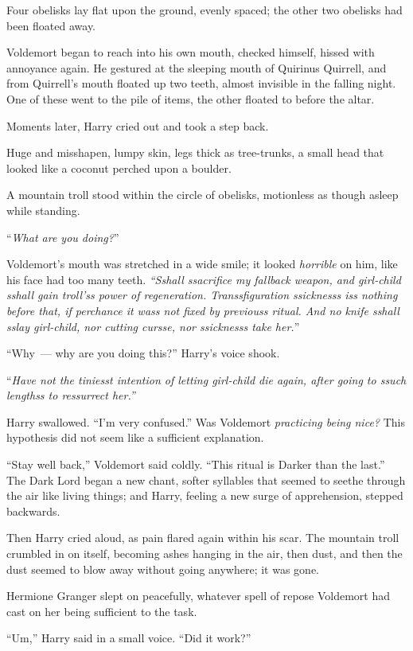 Four obelisks lay flat upon the ground, evenly spaced; the other two obelisks had been floated away.

Voldemort began to reach into his own mouth, checked himself, hissed with annoyance again. He gestured at the sleeping mouth of Quirinus Quirrell, and from Quirrell's mouth floated up two teeth, almost invisible in the falling night. One of these went to the pile of items, the other floated to before the altar.

Moments later, Harry cried out and took a step back.

Huge and misshapen, lumpy skin, legs thick as tree-trunks, a small head that looked like a coconut perched upon a boulder.

A mountain troll stood within the circle of obelisks, motionless as though asleep while standing.

``\emph{What are you doing?}''

Voldemort's mouth was stretched in a wide smile; it looked \emph{horrible} on him, like his face had too many teeth. \emph{``Sshall ssacrifice my fallback weapon, and girl-child sshall gain troll'ss power of regeneration. Transsfiguration ssicknesss iss nothing before that, if perchance it wass not fixed by previouss ritual. And no knife sshall sslay girl-child, nor cutting cursse, nor ssicknesss take her.}''

``Why~--- why are you doing this?'' Harry's voice shook.

``\emph{Have not the tiniesst intention of letting girl-child die again, after going to ssuch lengthss to ressurrect her.''}

Harry swallowed. ``I'm very confused.'' Was Voldemort \emph{practicing being nice?} This hypothesis did not seem like a sufficient explanation.

``Stay well back,'' Voldemort said coldly. ``This ritual is Darker than the last.'' The Dark Lord began a new chant, softer syllables that seemed to seethe through the air like living things; and Harry, feeling a new surge of apprehension, stepped backwards.

Then Harry cried aloud, as pain flared again within his scar. The mountain troll crumbled in on itself, becoming ashes hanging in the air, then dust, and then the dust seemed to blow away without going anywhere; it was gone.

Hermione Granger slept on peacefully, whatever spell of repose Voldemort had cast on her being sufficient to the task.

``Um,'' Harry said in a small voice. ``Did it work?''

